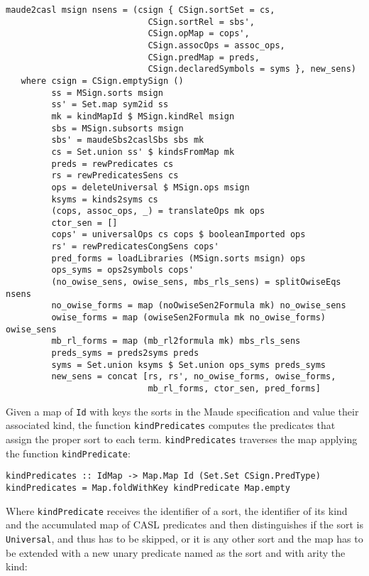 {\codesize
\begin{verbatim}
maude2casl msign nsens = (csign { CSign.sortSet = cs,
                            CSign.sortRel = sbs',
                            CSign.opMap = cops',
                            CSign.assocOps = assoc_ops,
                            CSign.predMap = preds,
                            CSign.declaredSymbols = syms }, new_sens)
   where csign = CSign.emptySign ()
         ss = MSign.sorts msign
         ss' = Set.map sym2id ss
         mk = kindMapId $ MSign.kindRel msign
         sbs = MSign.subsorts msign
         sbs' = maudeSbs2caslSbs sbs mk
         cs = Set.union ss' $ kindsFromMap mk
         preds = rewPredicates cs
         rs = rewPredicatesSens cs
         ops = deleteUniversal $ MSign.ops msign
         ksyms = kinds2syms cs
         (cops, assoc_ops, _) = translateOps mk ops
         ctor_sen = []
         cops' = universalOps cs cops $ booleanImported ops
         rs' = rewPredicatesCongSens cops'
         pred_forms = loadLibraries (MSign.sorts msign) ops
         ops_syms = ops2symbols cops'
         (no_owise_sens, owise_sens, mbs_rls_sens) = splitOwiseEqs nsens
         no_owise_forms = map (noOwiseSen2Formula mk) no_owise_sens
         owise_forms = map (owiseSen2Formula mk no_owise_forms) owise_sens
         mb_rl_forms = map (mb_rl2formula mk) mbs_rls_sens
         preds_syms = preds2syms preds
         syms = Set.union ksyms $ Set.union ops_syms preds_syms
         new_sens = concat [rs, rs', no_owise_forms, owise_forms,
                            mb_rl_forms, ctor_sen, pred_forms]
\end{verbatim}
}

Given a map of \verb"Id" with keys the sorts in the Maude specification and
value their associated kind, the function \verb"kindPredicates" computes
the predicates that assign the proper sort to each term.
\verb"kindPredicates" traverses the map applying the function
\verb"kindPredicate":

{\codesize
\begin{verbatim}
kindPredicates :: IdMap -> Map.Map Id (Set.Set CSign.PredType)
kindPredicates = Map.foldWithKey kindPredicate Map.empty
\end{verbatim}
}

Where \verb"kindPredicate" receives the identifier of a sort,
the identifier of its kind and the accumulated map of CASL predicates
and then distinguishes if the sort is \verb"Universal", and thus has to be
skipped, or it is any other sort and the map has to be extended with a
new unary predicate named as the sort and with arity the kind:

